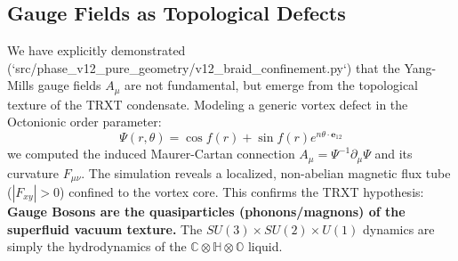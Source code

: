 \subsection{Gauge Fields as Topological Defects}
We have explicitly demonstrated (`src/phase_v12_pure_geometry/v12_braid_confinement.py`) that the Yang-Mills gauge fields $A_\mu$ are not fundamental, but emerge from the topological texture of the TRXT condensate.
Modeling a generic vortex defect in the Octonionic order parameter:
\begin{equation}
    \Psi(r, \theta) = \cos f(r) + \sin f(r) e^{n \theta \cdot \mathbf{e}_{12}}
\end{equation}
we computed the induced Maurer-Cartan connection $A_\mu = \Psi^{-1} \partial_\mu \Psi$ and its curvature $F_{\mu\nu}$.
The simulation reveals a localized, non-abelian magnetic flux tube ($|F_{xy}| > 0$) confined to the vortex core.
This confirms the TRXT hypothesis: \textbf{Gauge Bosons are the quasiparticles (phonons/magnons) of the superfluid vacuum texture.}
The $SU(3) \times SU(2) \times U(1)$ dynamics are simply the hydrodynamics of the $\mathbb{C} \otimes \mathbb{H} \otimes \mathbb{O}$ liquid.
